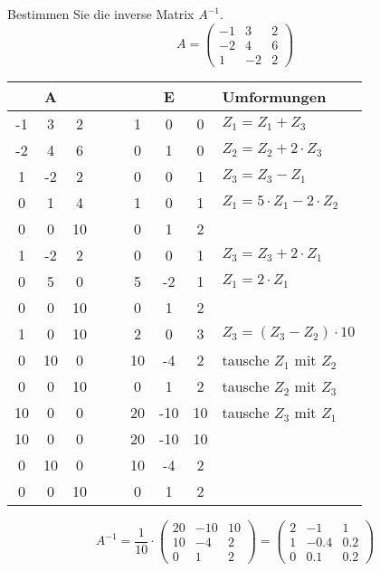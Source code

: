 \documentclass[a4paper, 12pt, margins=3cm]{homework}
\begin{document}
  \begin{problem}
    Bestimmen Sie die inverse Matrix $A^{-1}$.
    \[ A =
      \begin{pmatrix}
        -1 & 3 & 2 \\
        -2 & 4 & 6 \\
        1 & -2 & 2
      \end{pmatrix}
    \]
  \end{problem}
  \begin{solution}\hfill
    \begin{center}
      \begin{tabular}{ccclccc|l}
           & A  &    & $\quad$ &    & E   &    & Umformungen          \\ \hline
        -1 & 3  & 2  &          & 1  & 0   & 0  & $Z_1 = Z_1 + Z_3$   \\
        -2 & 4  & 6  &          & 0  & 1   & 0  & $Z_2 = Z_2 + 2\cdot Z_3$  \\
        1  & -2 & 2  &          & 0  & 0   & 1  & $Z_3 = Z_3 - Z_1$   \\ \hline
        0  & 1  & 4  &          & 1  & 0   & 1  & $Z_1 = 5\cdot Z_1 - 2\cdot Z_2$ \\
        0  & 0  & 10 &          & 0  & 1   & 2  &             \\
        1  & -2 & 2  &          & 0  & 0   & 1  & $Z_3 = Z_3 + 2\cdot Z_1$  \\ \hline
        0  & 5  & 0  &          & 5  & -2  & 1  & $Z_1 = 2\cdot Z_1$           \\
        0  & 0  & 10 &          & 0  & 1   & 2  &             \\
        1  & 0  & 10 &          & 2  & 0   & 3  & $Z_3 = (Z_3 - Z_2)\cdot 10$            \\ \hline
        0  & 10 & 0  &          & 10 & -4  & 2  & tausche $Z_1$ mit $Z_2$       \\
        0  & 0  & 10 &          & 0  & 1   & 2  & tausche $Z_2$ mit $Z_3$      \\
        10 & 0  & 0  &          & 20 & -10 & 10 & tausche $Z_3$ mit $Z_1$           \\ \hline
        10 & 0  & 0  &          & 20 & -10 & 10 &             \\
        0  & 10 & 0  &          & 10 & -4  & 2  &             \\
        0  & 0  & 10 &          & 0  & 1   & 2  &            
      \end{tabular}
    \end{center}
\vspace*{0.5cm}
    \[ 
      A^{-1} = \frac{1}{10}\cdot
      \begin{pmatrix}
        20 & -10 & 10 \\
        10 & -4 & 2 \\
        0 & 1 & 2
      \end{pmatrix}
      = 
      \begin{pmatrix}
        2 & -1 & 1 \\
        1 & -0.4 & 0.2 \\
        0 & 0.1 & 0.2
      \end{pmatrix}
    \]
  \end{solution}
\end{document}
